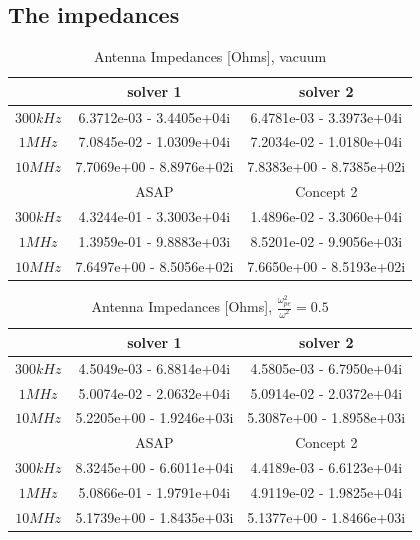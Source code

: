 \documentclass[two-column,ras]{agutex}
\begin{document}
\begin{article}
\subsection{The impedances}
\begin{table}
\caption{Antenna Impedances [Ohms], vacuum}
\label{tab:impedances_vacuum}
\begin{tabular}{|c|c|c|}
 \hline
 & solver 1  & solver 2  \\
\hline
$300 kHz$ & 6.3712e-03 - 3.4405e+04i &  6.4781e-03 - 3.3973e+04i \\
$1 MHz$ & 7.0845e-02 - 1.0309e+04i &  7.2034e-02 - 1.0180e+04i \\
$10 MHz$ &  7.7069e+00 - 8.8976e+02i&  7.8383e+00 - 8.7385e+02i\\
\hline
& ASAP  & Concept 2\\
\hline
$300 kHz$ &  4.3244e-01 - 3.3003e+04i &  1.4896e-02 - 3.3060e+04i\\
$1 MHz$ & 1.3959e-01 - 9.8883e+03i &  8.5201e-02 - 9.9056e+03i\\
$10 MHz$ &    7.6497e+00 - 8.5056e+02i&  7.6650e+00 - 8.5193e+02i\\
\hline
\end{tabular}
\end{table}




\begin{table}
\caption{Antenna Impedances [Ohms], $\frac{\omega_{pe}^2}{\omega^2}=0.5$}
\label{tab:impedances_plasma}
\begin{tabular}{|c|c|c|}
 \hline
 & solver 1  & solver 2  \\
\hline
$300 kHz$ & 4.5049e-03 - 6.8814e+04i & 4.5805e-03 - 6.7950e+04i  \\
$1 MHz$ &  5.0074e-02 - 2.0632e+04i &  5.0914e-02 - 2.0372e+04i \\
$10 MHz$ & 5.2205e+00 - 1.9246e+03i &  5.3087e+00 - 1.8958e+03i \\
\hline
& ASAP  & Concept 2  \\
\hline
$300 kHz$ & 8.3245e+00 - 6.6011e+04i &  4.4189e-03 - 6.6123e+04i \\
$1 MHz$ & 5.0866e-01 - 1.9791e+04i &  4.9119e-02 - 1.9825e+04i \\
$10 MHz$ &  5.1739e+00 - 1.8435e+03i&  5.1377e+00 - 1.8466e+03i \\
\hline
\end{tabular}
\end{table}


\end{article}
\end{document}
